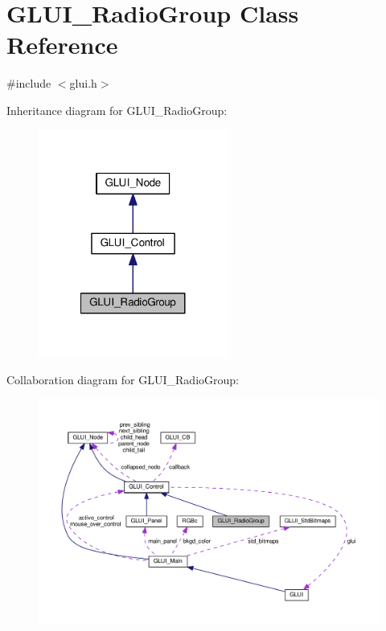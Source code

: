 \hypertarget{class_g_l_u_i___radio_group}{\section{G\+L\+U\+I\+\_\+\+Radio\+Group Class Reference}
\label{class_g_l_u_i___radio_group}
}


{\ttfamily \#include $<$glui.\+h$>$}



Inheritance diagram for G\+L\+U\+I\+\_\+\+Radio\+Group\+:\nopagebreak
\begin{figure}[H]
\begin{center}
\leavevmode
\includegraphics[width=176pt]{class_g_l_u_i___radio_group__inherit__graph}
\end{center}
\end{figure}


Collaboration diagram for G\+L\+U\+I\+\_\+\+Radio\+Group\+:\nopagebreak
\begin{figure}[H]
\begin{center}
\leavevmode
\includegraphics[width=350pt]{class_g_l_u_i___radio_group__coll__graph}
\end{center}
\end{figure}
